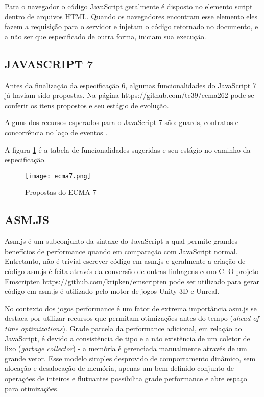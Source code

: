 Para o navegador o código JavaScript geralmente é disposto no elemento
script dentro de arquivos HTML. Quando os navegadores encontram esse
elemento eles fazem a requisição para o servidor e injetam o código
retornado no documento, e a não ser que especificado de outra forma,
iniciam sua execução.

\subsection{JAVASCRIPT 7}

Antes da finalização da especificação 6, algumas funcionalidades
do JavaScript 7 já haviam sido propostas. Na página
https://github.com/tc39/ecma262 pode-se conferir os itens propostos e
seu estágio de evolução.

Alguns dos recursos esperados para o JavaScript 7 são: guards, contratos
e concorrência no laço de eventos \autocite{ecma7}.

A figura \ref{fig:ecma7} é a tabela de funcionalidades sugeridas e seu
estágio no caminho da especificação.

\begin{figure}
    \centering
    \texttt{[image: ecma7.png]}
	\caption{Propostas do ECMA 7}
    \label{fig:ecma7}
\end{figure}

\subsection{ASM.JS}%

Asm.js é um subconjunto da sintaxe do JavaScript a qual permite
grandes benefícios de performance quando em comparação com
JavaScript normal. Entretanto, não é trivial escrever código em
asm.js e geralmente a criação de código asm.js é feita através
da conversão de outras linhagens como C. O projeto Emscripten
https://github.com/kripken/emscripten pode ser utilizado para gerar
código em asm.js é utilizado pelo motor de jogos Unity 3D e Unreal.

No contexto dos jogos performance é um fator de extrema importância
asm.js se destaca por utilizar recursos que permitam otimizações
antes do tempo (\textit{ahead of time optimizations}). Grade parcela
da performance adicional, em relação ao JavaScript, é devido a
consistência de tipo e a não existência de um coletor de lixo
(\textit{garbage collector}) - a memória é gerenciada manualmente
através de um grande vetor. Esse modelo simples desprovido de
comportamento dinâmico, sem alocação e desalocação de memória,
apenas um bem definido conjunto de operações de inteiros e flutuantes
possibilita grade performance e abre espaço para otimizações.

